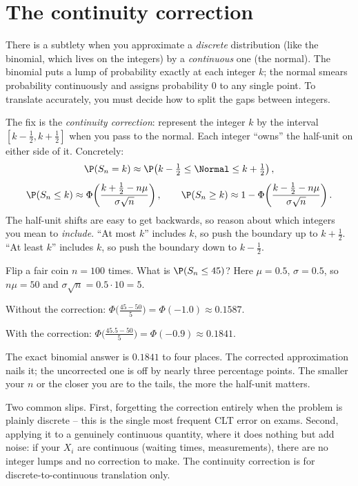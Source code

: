 \section{The continuity correction}
\label{ch21:continuity}

There is a subtlety when you approximate a \emph{discrete} distribution (like the
binomial, which lives on the integers) by a \emph{continuous} one (the normal). The
binomial puts a lump of probability exactly at each integer $k$; the normal smears
probability continuously and assigns probability $0$ to any single point. To translate
accurately, you must decide how to split the gaps between integers.

The fix is the \emph{continuity correction}: represent the integer $k$ by the interval
$[k - \tfrac12, k + \tfrac12]$ when you pass to the normal. Each integer ``owns'' the
half-unit on either side of it. Concretely:
\[
  \P(S_n = k) \approx \P\!\left(k - \tfrac12 \le \Normal \le k + \tfrac12\right),
\]
\[
  \P(S_n \le k) \approx \Phi\!\left(\frac{k + \tfrac12 - n\mu}{\sigma\sqrt n}\right),
  \qquad
  \P(S_n \ge k) \approx 1 - \Phi\!\left(\frac{k - \tfrac12 - n\mu}{\sigma\sqrt n}\right).
\]
The half-unit shifts are easy to get backwards, so reason about which integers you mean
to \emph{include}. ``At most $k$'' includes $k$, so push the boundary up to $k+\tfrac12$.
``At least $k$'' includes $k$, so push the boundary down to $k-\tfrac12$.

\begin{example}
\label{ch21:ex-cc}
Flip a fair coin $n = 100$ times. What is $\P(S_n \le 45)$? Here $\mu = 0.5$,
$\sigma = 0.5$, so $n\mu = 50$ and $\sigma\sqrt n = 0.5 \cdot 10 = 5$.

Without the correction:
$\Phi\!\big(\frac{45 - 50}{5}\big) = \Phi(-1.0) \approx 0.1587$.

With the correction:
$\Phi\!\big(\frac{45.5 - 50}{5}\big) = \Phi(-0.9) \approx 0.1841$.

The exact binomial answer is $0.1841$ to four places. The corrected approximation nails
it; the uncorrected one is off by nearly three percentage points. The smaller your $n$
or the closer you are to the tails, the more the half-unit matters.
\end{example}

\begin{trapbox}
Two common slips. First, forgetting the correction entirely when the problem is plainly
discrete -- this is the single most frequent CLT error on exams. Second, applying it to
a genuinely continuous quantity, where it does nothing but add noise: if your $X_i$ are
continuous (waiting times, measurements), there are no integer lumps and no correction
to make. The continuity correction is for discrete-to-continuous translation only.
\end{trapbox}

